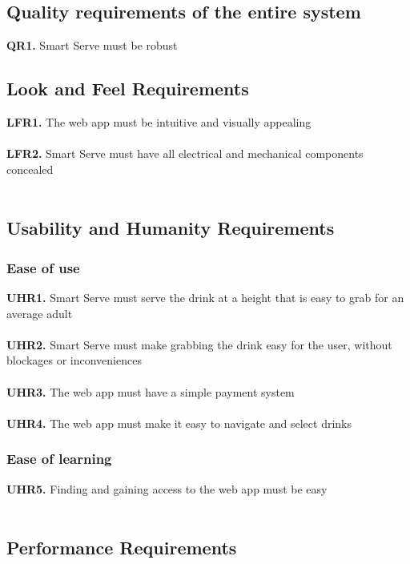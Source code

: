 \documentclass{article}
\begin{document}
\subsection{Quality requirements of the entire system}
    \noindent\textbf{QR1.} Smart Serve must be robust\\ 
    
\subsection{Look and Feel Requirements}
    \noindent\textbf{LFR1.} The web app must be intuitive and visually appealing \\\\
    \textbf{LFR2.} Smart Serve must have all electrical and mechanical components concealed \\\\

\subsection{Usability and Humanity Requirements}
    \subsubsection{Ease of use}
        \noindent\textbf{UHR1.} Smart Serve must serve the drink at a height that is easy to grab for an average adult \\\\
        \textbf{UHR2.} Smart Serve must make grabbing the drink easy for the user, without blockages or inconveniences\\\\
        \textbf{UHR3.} The web app must have a simple payment system\\\\
        \textbf{UHR4.} The web app must make it easy to navigate and select drinks\\
    \subsubsection{Ease of learning}
        \noindent\textbf{UHR5.} Finding and gaining access to the web app must be easy \\\\

\subsection{Performance Requirements}
\end{document}
